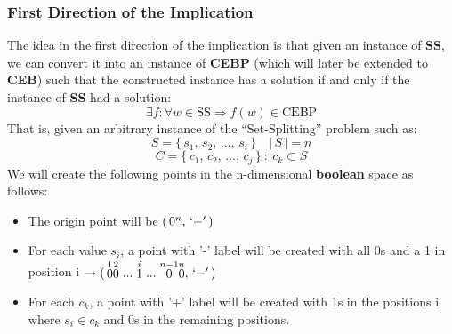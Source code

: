 \documentclass[../main]{subfiles}
\begin{document}
\subsubsection{First Direction of the Implication}
The idea in the first direction of the implication is that given an instance of \textbf{SS}, we can convert it into an instance of \textbf{CEBP} (which will later be extended to \textbf{CEB}) such that the constructed instance has a solution if and only if the instance of \textbf{SS} had a solution:
\begin{equation*}
\exists f : \forall w \in \text{SS} \Longrightarrow f(w) \in \text{CEBP}
\end{equation*}
That is, given an arbitrary instance of the ``Set-Splitting'' problem such as:
\begin{equation*}
    S = \{ \, s_1, \, s_2, \, ..., \, s_i \, \} \quad | \, S \, | = n
\end{equation*}
\begin{equation*}
    C = \{ \, c_1, \, c_2, \, ..., \, c_j \, \} \ : \ c_k \subset S
\end{equation*}
We will create the following points in the n-dimensional \textbf{boolean} space as follows:
\begin{itemize}
    \item[\textbullet] The origin point will be $(\,0^n, \, `+'\,)$
    \item[\textbullet] For each value $s_i$, a point with '-' label will be created with all 0s and a 1 in position i $\rightarrow (\,\stackrel{1}{0}\stackrel{2}{0}...\stackrel{i}{1}...\stackrel{n-1}{0}\stackrel{n}{0}, \, `-'\,) $
    \item[\textbullet] For each $c_k$, a point with '+' label will be created with 1s in the positions i where $s_i \in c_k$ and 0s in the remaining positions.
\end{itemize}
\end{document}
